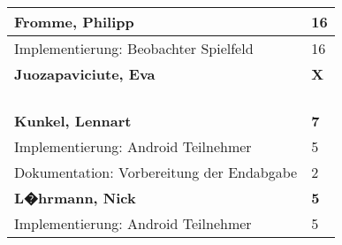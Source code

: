 \documentclass[a4paper,11pt]{scrartcl}
\begin{document}
\begin{longtable}{| p{13.8cm} | C{2.4cm} |}

	\textbf{Fromme, Philipp} & \textbf{16}\\ %
	\hline

  Implementierung: Beobachter Spielfeld
	&
	16
	\\
	\hline
	\hline


	\textbf{Juozapaviciute, Eva} & \textbf{X}\\ %
	\hline


	&

	\\
	\hline


	&

	\\
	\hline


	&

	\\
	\hline


	&

	\\
	\hline
	\hline


	\textbf{Kunkel, Lennart} & \textbf{7}\\ %
	\hline

  Implementierung: Android Teilnehmer
	&
  5
	\\
	\hline

  Dokumentation: Vorbereitung der Endabgabe
	&
  2
	\\
	\hline
	\hline


	\textbf{L�hrmann, Nick} & \textbf{5}\\ %
	\hline

	Implementierung: Android Teilnehmer
	&
	5
	\\
	\hline
	\hline



\end{longtable}
\end{document}

